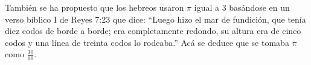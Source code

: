 \documentclass[preview]{standalone}
\begin{document}
\begin{center}
También se ha propuesto que los hebreos usaron $\pi$ igual a 3 basándose en un verso bíblico I de Reyes 7:23 que dice: ``Luego hizo el mar de fundición, que tenía diez codos de borde a borde; era completamente redondo, su altura era de cinco codos y una línea de treinta codos lo rodeaba.'' Acá se deduce que se tomaba $\pi$ como $\frac{30}{10}$.
\end{center}
\end{document}
